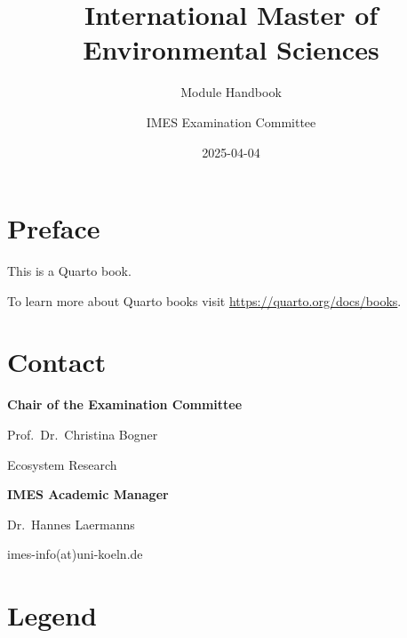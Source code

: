 \documentclass[
  letterpaper,
  10pt,
  openany]{book}
\title{International Master of Environmental Sciences}
\subtitle{Module Handbook}
\author{IMES Examination Committee}
\date{2025-04-04}
\renewcommand*\contentsname{Table of contents}
\newcommand\contentsname{Table of contents}
\begin{document}
\frontmatter
\maketitle

\renewcommand*\contentsname{Table of contents}
{
\setcounter{tocdepth}{0}
\tableofcontents
}

\mainmatter
{}

\chapter*{Preface}\label{preface}


This is a Quarto book.

To learn more about Quarto books visit
\url{https://quarto.org/docs/books}.


\chapter*{Contact}\label{contact}


\textbf{Chair of the Examination Committee}

Prof.~Dr.~Christina Bogner

Ecosystem Research

\textbf{IMES Academic Manager}

Dr.~Hannes Laermanns

imes-info(at)uni-koeln.de


\chapter*{Legend}\label{legend}

\end{document}
